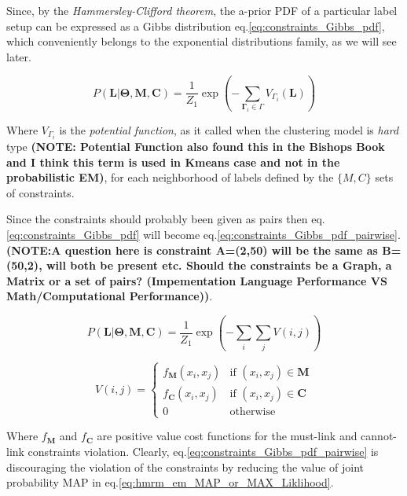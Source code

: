 \documentclass[dvips,dvipdfm,pdftex]{llncs}
\begin{document}
Since, by the \emph{Hammersley-Clifford theorem}, the a-prior PDF of a particular label setup can be expressed as a Gibbs distribution eq.\ref{eq:constraints_Gibbs_pdf}, which conveniently belongs to the exponential distributions family, as we will see later.

\begin{equation}
	P(\mathbf{L}|\mathbf{\Theta},\mathbf{M},\mathbf{C})=\frac{1}{Z_{1}}\exp(-\sum_{\mathbf{\Gamma}_{i}\in\Gamma}V_{\Gamma_{i}}(\mathbf{L}))
\label{eq:constraints_Gibbs_pdf}
\end{equation}

Where $V_{\Gamma_{i}}$ is the \emph{potential function}, as it called when the clustering model is \emph{hard} type \textbf{(NOTE: Potential Function also found this in the Bishops Book and I think this term is used in Kmeans case and not in the probabilistic EM)}, for each neighborhood of labels defined by the $\{M,C\}$ sets of constraints.

Since the constraints should probably been given as pairs then eq.\ref{eq:constraints_Gibbs_pdf} will become eq.\ref{eq:constraints_Gibbs_pdf_pairwise}.\textbf{(NOTE:A question here is constraint A=(2,50) will be the same as B=(50,2), will both be present etc. Should the constraints be a Graph, a Matrix or a set of pairs? (Impementation Language Performance VS Math/Computational Performance))}.

\begin{equation}
	P(\mathbf{L}|\mathbf{\Theta},\mathbf{M},\mathbf{C})=\frac{1}{Z_{1}}\exp(-\sum_{i}\sum_{j}V(i,j))
\label{eq:constraints_Gibbs_pdf_pairwise}
\end{equation}

\begin{equation}
	V(i,j)=
	\begin{cases}
		f_{\mathbf{M}}(x_{i},x_{j}) & \text{if }(x_{i},x_{j})\in\mathbf{M}\\
		f_{\mathbf{C}}(x_{i},x_{j}) & \text{if }(x_{i},x_{j})\in\mathbf{C}\\
		0 & \text{otherwise}
	\end{cases}
\label{eq:constraints_potential_function}
\end{equation}

Where $f_{\mathbf{M}}$ and $f_{\mathbf{C}}$ are positive value cost functions for the must-link and cannot-link constraints violation. Clearly, eq.\ref{eq:constraints_Gibbs_pdf_pairwise} is discouraging the violation of the constraints by reducing the value of joint probability MAP in eq.\ref{eq:hmrm_em_MAP_or_MAX_Liklihood}.
\end{document}

